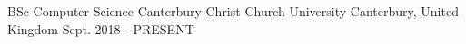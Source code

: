 

\begin{cventries}

  \cventry
    {BSc Computer Science} %
    {Canterbury Christ Church University} %
    {Canterbury, United Kingdom} %
    {Sept. 2018 - PRESENT} %
    {
      \begin{cvitems} %
      \end{cvitems}
    }

\end{cventries}

